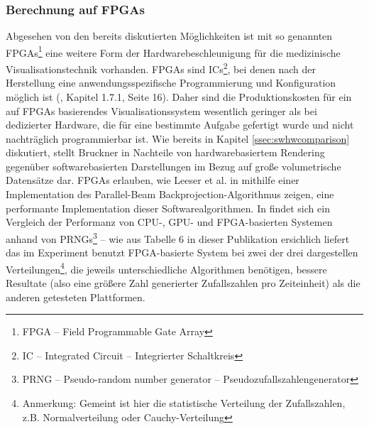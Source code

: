 \documentclass[ngerman,pdftex,paper=A4,DIV=calc,titlepage,12pt]{scrartcl}
\newtheorem[L]{boxedDefinition}{Definition}
\begin{document}
\subsubsection{Berechnung auf FPGAs}\label{sssec:fpgacalculation}
Abgesehen von den bereits diskutierten Möglichkeiten ist mit so genannten FPGAs\footnote{FPGA -- Field Programmable Gate Array} eine weitere Form der Hardwarebeschleunigung für die medizinische Visualisationstechnik vorhanden. FPGAs sind ICs\footnote{IC -- Integrated Circuit -- Integrierter Schaltkreis}, bei denen nach der Herstellung eine anwendungsspezifische Programmierung und Konfiguration möglich ist (\cite{Kibritev2009}, Kapitel 1.7.1, Seite 16). Daher sind die Produktionskosten für ein auf FPGAs basierendes Visualisationssystem wesentlich geringer als bei dedizierter Hardware, die für eine bestimmte Aufgabe gefertigt wurde und nicht nachträglich programmierbar ist. Wie bereits in Kapitel \vref{ssec:swhwcomparison} diskutiert, stellt Bruckner in \cite{Bruckner2004} Nachteile von hardwarebasiertem Rendering gegenüber softwarebasierten Darstellungen im Bezug auf große volumetrische Datensätze dar. FPGAs erlauben, wie Leeser et al. in \cite{Leeser2005} mithilfe einer Implementation des Parallel-Beam Backprojection-Algorithmus zeigen, eine performante Implementation dieser Softwarealgorithmen. In \cite{Thomas2009} findet sich ein Vergleich der Performanz von CPU-, GPU- und FPGA-basierten Systemen anhand von PRNGs\footnote{PRNG -- Pseudo-random number generator -- Pseudozufallszahlengenerator} -- wie aus Tabelle 6 in dieser Publikation ersichlich liefert das im Experiment benutzt FPGA-basierte System bei zwei der drei dargestellen Verteilungen\footnote{Anmerkung: Gemeint ist hier die statistische Verteilung der Zufallszahlen, z.B. Normalverteilung oder Cauchy-Verteilung}, die jeweils unterschiedliche Algorithmen benötigen, bessere Resultate (also eine größere Zahl generierter Zufallszahlen pro Zeiteinheit) als die anderen getesteten Plattformen.
\end{document}
